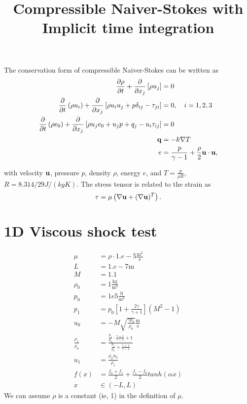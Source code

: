 \documentclass[10pt]{article}
\begin{document}
\title{Compressible Naiver-Stokes with Implicit time integration}
\maketitle
The conservation form of compressible Naiver-Stokes can be written as
\begin{equation}
\begin{aligned}
\frac{\partial \rho}{\partial t} + \frac{\partial}{\partial x_j}\left[ \rho u_j \right] &= 0 \\
\frac{\partial}{\partial t}\left( \rho u_i \right) + \frac{\partial}{\partial x_j} \left[ \rho u_i u_j + p \delta_{ij} - \tau_{ji} \right] &= 0, \quad i=1,2,3 \\
\frac{\partial}{\partial t}\left( \rho e_0 \right) +
\frac{\partial}{\partial x_j}\left[ \rho u_j e_0 + u_j p + q_j - u_i \tau_{ij} \right] &= 0 \\
{\bf q} &= -k\nabla T \\
  e &= \frac{p}{\gamma - 1}+ \frac{\rho}{2}{{\bf u} \cdot {\bf u}} ,
\end{aligned}
\end{equation}

with velocity $\bf u$, pressure $p$, density $\rho$, energy $e$, and $T = \frac{p}{\rho R}$, $R = 8.314/29 J/(kg K)$.
The stress tensor is related to the strain as
\[
  {\bf \tau}=\mu\left(\nabla{\bf u}+(\nabla {\bf u})^T\right).
\]

\section{1D Viscous shock test}
\begin{equation}
\begin{aligned}
\mu&=  \rho \cdot 1.e-5 \mathrm{\frac{m^2}{s}} \\
L&=1.e-7 \mathrm{m}\\
M &= 1.1 \\
\rho_0 &= 1 \mathrm{\frac{kg}{m^3}}\\
p_0 &= 1e5 \mathrm{\frac{N}{m^2}}\\
p_1 &= p_0 \left [ 1+\frac{2\gamma}{\gamma+1} \right ] \left ( M^2 - 1 \right )  \\
u_0 &= -M\sqrt{\frac{\gamma p_0}{\rho_0}} \mathrm{\frac{m}{s}} \\
\frac{\rho_1}{\rho_0} &= \frac{\frac{p_1}{p_0} \cdot \frac{\gamma +1}{\gamma -1} + 1}{\frac{p_1}{p_0}+  \frac{\gamma +1}{\gamma -1}} \\
u_1&=\frac{\rho_0 u_0}{\rho_1} \\
f(x) &= \frac{f_0+f_1}{2}+ \frac{f_1-f_0}{2}tanh(\alpha x) \\
x &\in \left ( -L,L \right )
\end{aligned}
\end{equation}
We can assume $\rho$ is a constant (ie, 1) in the definition of $\mu$.













\end{document}
